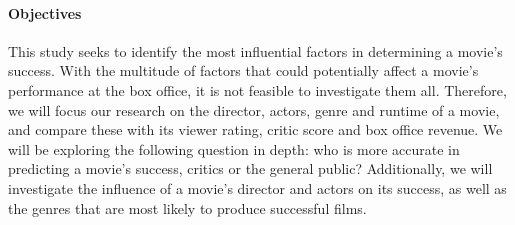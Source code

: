     \paragraph{Objectives}
        This study seeks to identify the most influential factors in determining a
            movie's success.
        With the multitude of factors that could potentially affect a movie's
            performance at the box office, it is not feasible to investigate them all.
        Therefore, we will focus our research on the director, actors, genre and
            runtime of a movie, and compare these with its viewer rating, critic score and
            box office revenue.
        We will be exploring the following question in depth: who is more accurate in
            predicting a movie's success, critics or the general public?
        Additionally, we will investigate the influence of a movie's director and
            actors on its success, as well as the genres that are most likely to produce
            successful films.
